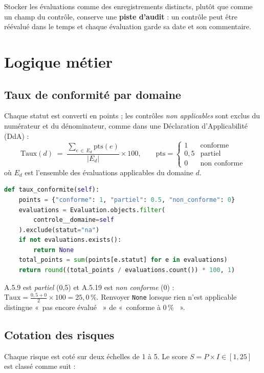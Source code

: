 \documentclass[11pt,a4paper]{article}
\providecommand{\og}{«~}\providecommand{\fg}{~»}
\newcommand{\code}[1]{\texttt{#1}}
\begin{document}
Stocker les évaluations comme des enregistrements distincts, plutôt que comme un champ du contrôle, conserve une \textbf{piste d'audit} : un contrôle peut être réévalué dans le temps et chaque évaluation garde sa date et son commentaire.

\section{Logique métier}
\subsection{Taux de conformité par domaine}
Chaque statut est converti en points ; les contrôles \emph{non applicables} sont exclus du numérateur et du dénominateur, comme dans une Déclaration d'Applicabilité (DdA) :
\[
\text{Taux}(d) \;=\; \frac{\displaystyle\sum_{e\,\in\,E_d} \text{pts}(e)}{|E_d|}\times 100,
\qquad
\text{pts}=\begin{cases}1 & \text{conforme}\\ 0{,}5 & \text{partiel}\\ 0 & \text{non conforme}\end{cases}
\]
où $E_d$ est l'ensemble des évaluations applicables du domaine $d$.

\begin{lstlisting}[language=Python]
def taux_conformite(self):
    points = {"conforme": 1, "partiel": 0.5, "non_conforme": 0}
    evaluations = Evaluation.objects.filter(
        controle__domaine=self
    ).exclude(statut="na")
    if not evaluations.exists():
        return None
    total_points = sum(points[e.statut] for e in evaluations)
    return round((total_points / evaluations.count()) * 100, 1)
\end{lstlisting}

\begin{keybox}[title=Exemple de calcul --- Organisationnel]
A.5.9 est \emph{partiel} (0,5) et A.5.19 est \emph{non conforme} (0) : $\text{Taux} = \frac{0{,}5+0}{2}\times100 = 25{,}0\,\%$.
Renvoyer \code{None} lorsque rien n'est applicable distingue \og pas encore évalué \fg{} de \og conforme à 0\,\% \fg{}.
\end{keybox}

\subsection{Cotation des risques}
Chaque risque est coté sur deux échelles de 1 à 5. Le score $S = P\times I \in [1,25]$ est classé comme suit :
\end{document}
